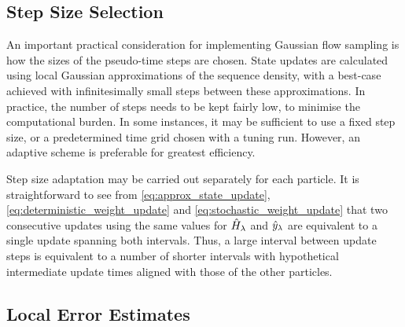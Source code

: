 \documentclass{article}
\begin{document}
\subsection{Step Size Selection}

An important practical consideration for implementing Gaussian flow sampling is how the sizes of the pseudo-time steps are chosen. State updates are calculated using local Gaussian approximations of the sequence density, with a best-case achieved with infinitesimally small steps between these approximations. In practice, the number of steps needs to be kept fairly low, to minimise the computational burden. In some instances, it may be sufficient to use a fixed step size, or a predetermined time grid chosen with a tuning run. However, an adaptive scheme is preferable for greatest efficiency.

Step size adaptation may be carried out separately for each particle. It is straightforward to see from \eqref{eq:approx_state_update}, \eqref{eq:deterministic_weight_update} and \eqref{eq:stochastic_weight_update} that two consecutive updates using the same values for $\hat{H}_{\lambda}$ and $\hat{y}_{\lambda}$ are equivalent to a single update spanning both intervals. Thus, a large interval between update steps is equivalent to a number of shorter intervals with hypothetical intermediate update times aligned with those of the other particles.


\subsection{Local Error Estimates}
\end{document}
